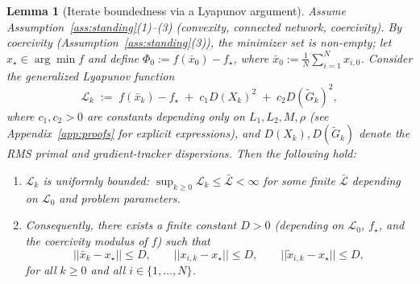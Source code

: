 \documentclass[11pt,a4paper]{article}
\def\norm#1{||#1||}%
\newtheorem{lemma}[theorem]{Lemma}
\newcommand{\norm}[1]{\left\|#1\right\|}
\begin{document}
	\begin{lemma}[Iterate boundedness via a Lyapunov argument]\label{lem:lyap_bound}
		Assume Assumption~\ref{ass:standing}(1)--(3) (convexity, connected network, coercivity).
		By coercivity (Assumption~\ref{ass:standing}(3)), the minimizer set is non-empty;
		let $x_\star\in\arg\min f$ and define
		$\Phi_0:=f(\bar x_0)-f_\star$, where $\bar x_0:=\frac1N\sum_{i=1}^N x_{i,0}$.
		Consider the generalized Lyapunov function
		\[
		\mathcal L_k \;:=\; f(\bar x_k)-f_\star \;+\; c_1 D(X_k)^2 \;+\; c_2 D(\tilde G_k)^2,
		\]
		where $c_1,c_2>0$ are constants depending only on $L_1,L_2,M,\rho$
		(see Appendix~\ref{app:proofs} for explicit expressions), and
		$D(X_k), D(\tilde G_k)$ denote the RMS primal and gradient-tracker dispersions.
		Then the following hold:
		\begin{enumerate}[leftmargin=1.2em,itemsep=2pt]
			\item $\mathcal L_k$ is uniformly bounded: $\sup_{k\ge 0}\mathcal L_k \le \bar{\mathcal L} < \infty$ for some finite $\bar{\mathcal L}$ depending on $\mathcal L_0$ and problem parameters.
			\item Consequently, there exists a finite constant $D>0$
			(depending on $\mathcal L_0$, $f_\star$, and the coercivity modulus of $f$)
			such that
			\begin{equation}\label{eq:bounded_levelset}
				\norm{\bar x_k-x_\star}\le D,
				\qquad
				\norm{x_{i,k}-x_\star}\le D,
				\qquad
				\norm{\tilde x_{i,k}-x_\star}\le D,
			\end{equation}
			for all $k\ge 0$ and all $i\in\{1,\dots,N\}$.
		\end{enumerate}
	\end{lemma}
\end{document}
